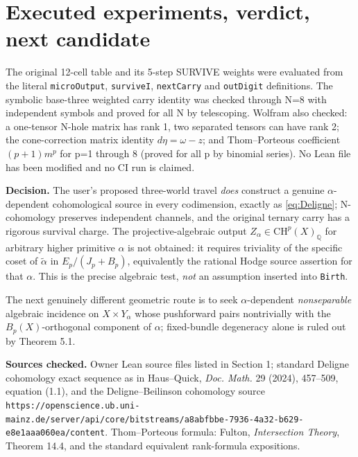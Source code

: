 \documentclass[11pt]{article}
\newcommand{\Q}{\mathbb Q}
\newcommand{\CH}{\mathrm{CH}}
\begin{document}
\section{Executed experiments, verdict, next candidate}

The original 12-cell table and its 5-step SURVIVE weights were
evaluated from the literal \texttt{microOutput}, \texttt{surviveI},
\texttt{nextCarry} and \texttt{outDigit} definitions. The symbolic
base-three weighted carry identity was checked through N=8
with independent symbols and proved for all N by telescoping.
Wolfram also checked: a one-tensor N-hole matrix has rank 1,
two separated tensors can have rank 2; the cone-correction
matrix identity \(d\eta=\omega-z\); and Thom--Porteous coefficient
\((p+1)m^p\) for p=1 through 8 (proved for all p by binomial series).
No Lean file has been modified and no CI run is claimed.

\noindent\textbf{Decision.}
The user's proposed three-world travel \emph{does}
construct a genuine \(\alpha\)-dependent cohomological source
in every codimension, exactly as \eqref{eq:Deligne};
N-cohomology preserves independent channels, and the original
ternary carry has a rigorous survival charge.
The projective-algebraic output
\(Z_\alpha\in\CH^p(X)_\Q\) for arbitrary higher primitive
\(\alpha\) is not obtained: it requires triviality of the
specific coset of \(\widetilde\alpha\) in
\(E_p/(J_p+B_p)\), equivalently the rational Hodge source
assertion for that \(\alpha\). This is the precise algebraic
test, \emph{not} an assumption inserted into \texttt{Birth}.

The next genuinely different geometric route is to seek
\(\alpha\)-dependent \emph{nonseparable} algebraic incidence
on \(X\times Y_\alpha\) whose pushforward pairs nontrivially
with the \(B_p(X)\)-orthogonal component of \(\alpha\);
fixed-bundle degeneracy alone is ruled out by Theorem 5.1.

\noindent\textbf{Sources checked.}
Owner Lean source files listed in Section 1; standard Deligne
cohomology exact sequence as in Haus--Quick,
\emph{Doc. Math.} 29 (2024), 457--509, equation (1.1),
and the Deligne--Beilinson cohomology source
\texttt{https://openscience.ub.uni-mainz.de/server/api/core/bitstreams/a8abfbbe-7936-4a32-b629-e8e1aaa060ea/content}.
Thom--Porteous formula: Fulton,
\emph{Intersection Theory}, Theorem 14.4, and the
standard equivalent rank-formula expositions.
\end{document}
